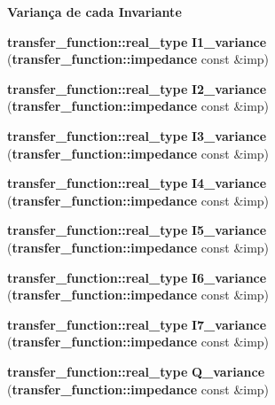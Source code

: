 \begin{Indent}{\bf Variança de cada Invariante}\par
\begin{CompactItemize}
\item 
{\bf transfer\_\-function::real\_\-type} \textbf{I1\_\-variance} ({\bf transfer\_\-function::impedance} const \&imp)\label{namespaceerro__manual_1_1base__xi__eta_1_1wal__invariant_80b89b5e41b150b9b18e3df33af35fdd}

\item 
{\bf transfer\_\-function::real\_\-type} \textbf{I2\_\-variance} ({\bf transfer\_\-function::impedance} const \&imp)\label{namespaceerro__manual_1_1base__xi__eta_1_1wal__invariant_afbc5c1205bfae59e3ac61e02d159c65}

\item 
{\bf transfer\_\-function::real\_\-type} \textbf{I3\_\-variance} ({\bf transfer\_\-function::impedance} const \&imp)\label{namespaceerro__manual_1_1base__xi__eta_1_1wal__invariant_6205ce9bcce986d1c6da3b1706ced303}

\item 
{\bf transfer\_\-function::real\_\-type} \textbf{I4\_\-variance} ({\bf transfer\_\-function::impedance} const \&imp)\label{namespaceerro__manual_1_1base__xi__eta_1_1wal__invariant_0b5049bdf8fbe8d01d1bfd63d6e850b6}

\item 
{\bf transfer\_\-function::real\_\-type} \textbf{I5\_\-variance} ({\bf transfer\_\-function::impedance} const \&imp)\label{namespaceerro__manual_1_1base__xi__eta_1_1wal__invariant_ec20dda7bd10d4c497117876fecc2e90}

\item 
{\bf transfer\_\-function::real\_\-type} \textbf{I6\_\-variance} ({\bf transfer\_\-function::impedance} const \&imp)\label{namespaceerro__manual_1_1base__xi__eta_1_1wal__invariant_243a44890f22b0bca362513d76ca69bf}

\item 
{\bf transfer\_\-function::real\_\-type} \textbf{I7\_\-variance} ({\bf transfer\_\-function::impedance} const \&imp)\label{namespaceerro__manual_1_1base__xi__eta_1_1wal__invariant_70bc41ff4b971e1406bf2cd5597f0459}

\item 
{\bf transfer\_\-function::real\_\-type} \textbf{Q\_\-variance} ({\bf transfer\_\-function::impedance} const \&imp)\label{namespaceerro__manual_1_1base__xi__eta_1_1wal__invariant_864b6c7439ca932ea9fa9c437541c1e5}


\end{CompactItemize}
\end{Indent}
